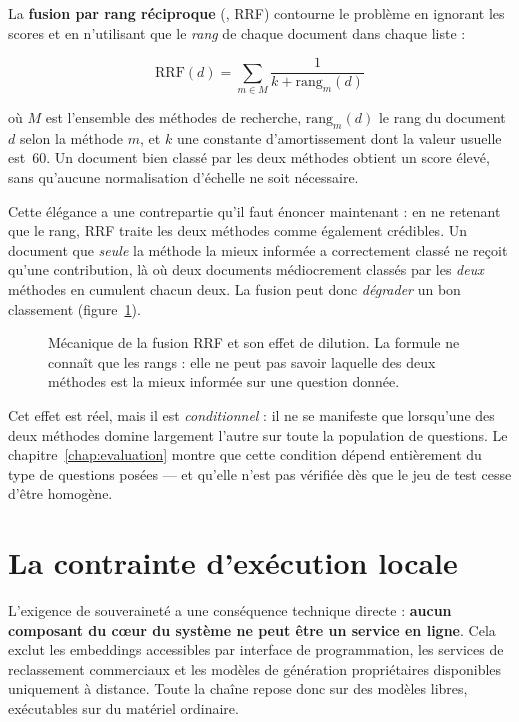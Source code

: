 La \textbf{fusion par rang réciproque} (, RRF) contourne le
problème en ignorant les scores et en n'utilisant que le \emph{rang} de chaque document dans
chaque liste :

\begin{equation}
  \mathrm{RRF}(d) = \sum_{m \in M} \frac{1}{k + \mathrm{rang}_m(d)}
  \label{eq:rrf}
\end{equation}

où $M$ est l'ensemble des méthodes de recherche, $\mathrm{rang}_m(d)$ le rang du document $d$
selon la méthode $m$, et $k$ une constante d'amortissement dont la valeur usuelle est~60. Un
document bien classé par les deux méthodes obtient un score élevé, sans qu'aucune normalisation
d'échelle ne soit nécessaire.

Cette élégance a une contrepartie qu'il faut énoncer maintenant : en ne retenant que le rang, RRF
traite les deux méthodes comme également crédibles. Un document que \emph{seule} la méthode la
mieux informée a correctement classé ne reçoit qu'une contribution, là où deux documents
médiocrement classés par les \emph{deux} méthodes en cumulent chacun deux. La fusion peut donc
\emph{dégrader} un bon classement (figure~\ref{fig:rrf}).

\begin{figure}[htbp]
  \centering
  
  \caption[Mécanique de la fusion RRF]{Mécanique de la fusion RRF et son effet de dilution. La
  formule ne connaît que les rangs : elle ne peut pas savoir laquelle des deux méthodes est la
  mieux informée sur une question donnée.}
  \label{fig:rrf}
\end{figure}

Cet effet est réel, mais il est \emph{conditionnel} : il ne se manifeste que lorsqu'une des deux
méthodes domine largement l'autre sur toute la population de questions. Le
chapitre~\ref{chap:evaluation} montre que cette condition dépend entièrement du type de questions
posées --- et qu'elle n'est pas vérifiée dès que le jeu de test cesse d'être homogène.

\section{La contrainte d'exécution locale}

L'exigence de souveraineté a une conséquence technique directe : \textbf{aucun composant du cœur
du système ne peut être un service en ligne}. Cela exclut les embeddings accessibles par
interface de programmation, les services de reclassement commerciaux et les modèles de génération
propriétaires disponibles uniquement à distance. Toute la chaîne repose donc sur des modèles
libres, exécutables sur du matériel ordinaire.

